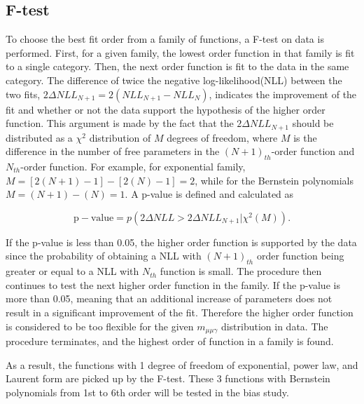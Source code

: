		\subsection{F-test}
		\label{sec:ftest}
		To choose the best fit order from a family of functions, a F-test on data is performed. First, for a given family, the lowest order function in that family is fit to a single category. Then, the next order function is fit to the data in the same category. 	The difference of twice the negative log-likelihood(NLL) between the two fits, $2\Delta NLL_{N+1} = 2(NLL_{N+1}-NLL_N)$, indicates the improvement of the fit and whether or not the data support the hypothesis of the higher order function. This argument is made by the fact that the $2\Delta NLL_{N+1}$ should be distributed as a $\chi^{2}$ distribution of $M$ degrees of freedom, where $M$ is the difference in the number of free parameters in the $(N+1)_{th}$-order function and $N_{th}$-order function.	For example, for exponential family, $M=[2(N+1)-1]-[2(N)-1]=2$, while for the Bernstein polynomials $M=(N+1)-(N)=1$.
		A p-value is defined and calculated as
		
		\begin{equation}
		\mathrm{p-value} = p(2\Delta NLL > 2\Delta NLL_{N+1} | \chi^{2}(M)).
		\end{equation}
		
		If the p-value is less than 0.05, the higher order function is supported by the data since the probability of obtaining a NLL with $(N+1)_{th}$ order function being greater or equal to a NLL with $N_{th}$ function is small. The procedure then continues to test the next higher order function in the family. 
		If the p-value is more than 0.05, meaning that an additional increase of parameters does not result in a significant improvement of the fit. Therefore the higher order function is considered to be too flexible for the given $m_{\mu\mu\gamma}$ distribution in data. The procedure terminates, and the highest order of function in a family is found. 
		
		As a result, the functions with 1 degree of freedom of exponential, power law, and Laurent form are picked up by the F-test. These 3 functions with Bernstein polynomials from 1st to 6th order will be tested in the bias study.
		
